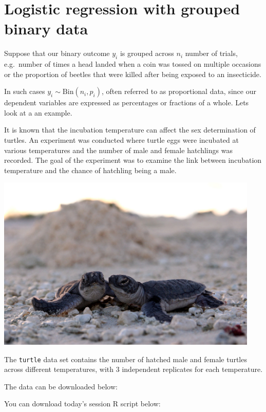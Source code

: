 \documentclass[
  letterpaper,
  DIV=11,
  numbers=noendperiod]{scrartcl}
\begin{document}
\section{Logistic regression with grouped binary
data}\label{logistic-regression-with-grouped-binary-data}

Suppose that our binary outcome \(y_i\) is grouped across \(n_i\) number
of trials, e.g.~number of times a head landed when a coin was tossed on
multiple occasions or the proportion of beetles that were killed after
being exposed to an insecticide.

In such cases \(y_i \sim \mathrm{Bin}(n_i,p_i)\), often referred to as
proportional data, since our dependent variables are expressed as
percentages or fractions of a whole. Lets look at a an example.

It is known that the incubation temperature can affect the sex
determination of turtles. An experiment was conducted where turtle eggs
were incubated at various temperatures and the number of male and female
hatchlings was recorded. The goal of the experiment was to examine the
link between incubation temperature and the chance of hatchling being a
male.

\begin{center}
\includegraphics[width=4.92708in,height=\textheight]{turtles.jpg}
\end{center}

The \texttt{turtle} data set contains the number of hatched male and
female turtles across different temperatures, with 3 independent
replicates for each temperature.

The data can be downloaded below:

You can download today's session R script below:
\end{document}
